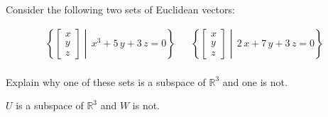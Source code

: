 
\begin{exerciseStatement}


Consider the following two sets of Euclidean vectors: 


\begin{align*}  \left\{ \left[\begin{array}{c}
x \\
y \\
z
\end{array}\right] \middle|\,x^{3} + 5 \, y + 3 \, z = 0\right\}  & &   \left\{ \left[\begin{array}{c}
x \\
y \\
z
\end{array}\right] \middle|\,2 \, x + 7 \, y + 3 \, z = 0\right\}  \\ \end{align*}
            

 Explain why one of these sets is a subspace of \(\mathbb{R}^ 3 \) and one is not. 


\end{exerciseStatement}
    
\begin{exerciseAnswer} 


\(U\) is a subspace of \(\mathbb{R}^ 3 \) and \(W\) is not.


\end{exerciseAnswer}
    
